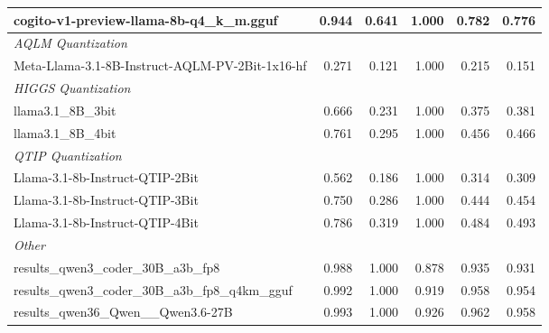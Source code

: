 \begin{table}[htbp]
{\begin{tabular}{lrrrrr}
    cogito-v1-preview-llama-8b-q4\_k\_m.gguf & 0.944 & 0.641 & 1.000 & 0.782 & 0.776 \\
    \midrule
    \multicolumn{6}{l}{\textit{AQLM Quantization}} \\
    \midrule
    Meta-Llama-3.1-8B-Instruct-AQLM-PV-2Bit-1x16-hf & 0.271 & 0.121 & 1.000 & 0.215 & 0.151 \\
    \midrule
    \multicolumn{6}{l}{\textit{HIGGS Quantization}} \\
    \midrule
    llama3.1\_8B\_3bit & 0.666 & 0.231 & 1.000 & 0.375 & 0.381 \\
    llama3.1\_8B\_4bit & 0.761 & 0.295 & 1.000 & 0.456 & 0.466 \\
    \midrule
    \multicolumn{6}{l}{\textit{QTIP Quantization}} \\
    \midrule
    Llama-3.1-8b-Instruct-QTIP-2Bit & 0.562 & 0.186 & 1.000 & 0.314 & 0.309 \\
    Llama-3.1-8b-Instruct-QTIP-3Bit & 0.750 & 0.286 & 1.000 & 0.444 & 0.454 \\
    Llama-3.1-8b-Instruct-QTIP-4Bit & 0.786 & 0.319 & 1.000 & 0.484 & 0.493 \\
    \midrule
    \multicolumn{6}{l}{\textit{Other}} \\
    \midrule
    results\_qwen3\_coder\_30B\_a3b\_fp8 & 0.988 & 1.000 & 0.878 & 0.935 & 0.931 \\
    results\_qwen3\_coder\_30B\_a3b\_fp8\_q4km\_gguf & 0.992 & 1.000 & 0.919 & 0.958 & 0.954 \\
    results\_qwen36\_Qwen\_\_Qwen3.6-27B & 0.993 & 1.000 & 0.926 & 0.962 & 0.958 \\
    \bottomrule
  \end{tabular}
  }
\end{table}

